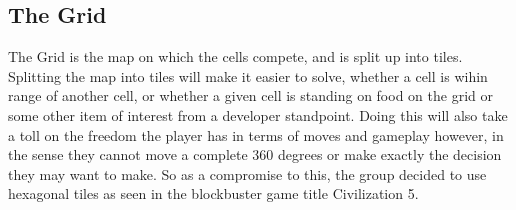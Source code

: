 \subsection{The Grid}

The Grid is the map on which the cells compete, and is split up into tiles. Splitting the map into tiles will make it easier to solve, whether a cell 
is wihin range of another cell, or whether a given cell is standing on food on the grid or some other item of interest from a developer standpoint. 
Doing this will also take a toll on the freedom the player has in terms of moves and gameplay however, in the sense they cannot move a complete 360 
degrees or make exactly the decision they may want to make. So as a compromise to this, the group decided to use hexagonal tiles as seen in the 
blockbuster game title Civilization 5.